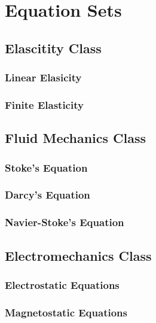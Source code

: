 \clearemptydoublepage
\chapter{Equation Sets}
\label{cha:equationsets}

\section{Elascitity Class}

\subsection{Linear Elasicity}

\subsection{Finite Elasticity}

\section{Fluid Mechanics Class}

\subsection{Stoke's Equation}

\subsection{Darcy's Equation}

\subsection{Navier-Stoke's Equation}

\section{Electromechanics Class}

\subsection{Electrostatic Equations}

\subsection{Magnetostatic Equations}

